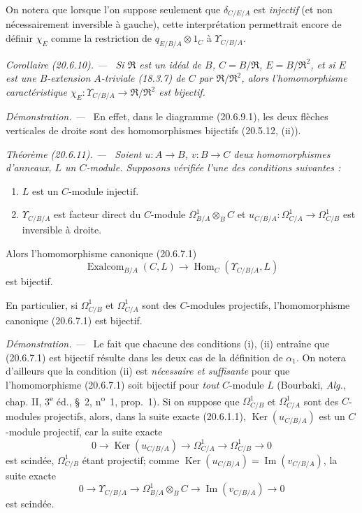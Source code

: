 \documentclass[10pt,oneside]{book}
\makeatletter
\newcommand{\setmanualcurrentlabel}[1]{\def\@currentlabel{#1}}
\newcommand{\oldpage}[2][]{%
  \setcounter{footnote}{0}%
  \marginpar{\scriptsize\textbf{#1}~|~#2}\ignorespaces}
\newenvironment{theorem}[1][]{%
  \setmanualcurrentlabel{#1}\par\medskip\noindent\itshape Théorème (#1). ---\ }{\par}
\newenvironment{corollary}[1][]{%
  \setmanualcurrentlabel{#1}\par\medskip\noindent\itshape Corollaire (#1). ---\ }{\par}
\newenvironment{proof}{%
  \par\medskip\noindent\textit{Démonstration. ---\ }}{\par}
\makeatother
\begin{document}
On notera que lorsque l'on suppose seulement que $\delta_{C/E/A}$ est
\emph{injectif} (et non nécessairement inversible à gauche), cette
interprétation permettrait encore de définir $\chi_E$ comme la
restriction de $q_{E/B/A}\otimes1_C$ à $\Upsilon_{C/B/A}$.

\begin{corollary}[20.6.10]
\label{0.20.6.10-fr}
Si $\mathfrak{R}$ est un idéal de $B$, $C=B/\mathfrak{R}$,
$E=B/\mathfrak{R}^2$, et si $E$ est une $B$-extension $A$-triviale
(18.3.7) de $C$ par $\mathfrak{R}/\mathfrak{R}^2$, alors
l'homomorphisme caractéristique
$\chi_E:\Upsilon_{C/B/A}\to\mathfrak{R}/\mathfrak{R}^2$ est bijectif.
\end{corollary}

\begin{proof}
\oldpage[0\textsubscript{IV-1}]{140}
En effet, dans le diagramme (20.6.9.1), les deux flèches verticales de
droite sont des homomorphismes bijectifs (20.5.12, (ii)).
\end{proof}

\begin{theorem}[20.6.11]
\label{0.20.6.11-fr}
Soient $u:A\to B$, $v:B\to C$ deux homomorphismes d'anneaux, $L$ un
$C$-module. Supposons vérifiée l'une des conditions suivantes :
\begin{enumerate}
  \item[\rm(i)] $L$ est un $C$-module injectif.
  \item[\rm(ii)] $\Upsilon_{C/B/A}$ est facteur direct du $C$-module
$\Omega^1_{B/A}\otimes_B C$ et
$u_{C/B/A}:\Omega^1_{C/A}\to\Omega^1_{C/B}$ est inversible à droite.
\end{enumerate}
Alors l'homomorphisme canonique (20.6.7.1)
\[
  \operatorname{Exalcom}_{B/A}(C,L)\longrightarrow
  \operatorname{Hom}_C(\Upsilon_{C/B/A},L)
\]
est bijectif.

En particulier, si $\Omega^1_{C/B}$ et $\Omega^1_{C/A}$ sont des
$C$-modules projectifs, l'homomorphisme canonique (20.6.7.1) est
bijectif.
\end{theorem}

\begin{proof}
Le fait que chacune des conditions (i), (ii) entraîne que (20.6.7.1) est
bijectif résulte dans les deux cas de la définition de $\alpha_1$. On
notera d'ailleurs que la condition (ii) est \emph{nécessaire et
suffisante} pour que l'homomorphisme (20.6.7.1) soit bijectif pour
\emph{tout} $C$-module $L$ (Bourbaki, \emph{Alg.}, chap. II,
3\textsuperscript{e} éd., \S~2, n\textsuperscript{o}~1, prop.~1). Si on
suppose que $\Omega^1_{C/B}$ et $\Omega^1_{C/A}$ sont des $C$-modules
projectifs, alors, dans la suite exacte (20.6.1.1),
$\operatorname{Ker}(u_{C/B/A})$ est un $C$-module projectif, car la suite exacte
\[
  0\longrightarrow\operatorname{Ker}(u_{C/B/A})\longrightarrow\Omega^1_{C/A}
  \longrightarrow\Omega^1_{C/B}\longrightarrow0
\]
est scindée, $\Omega^1_{C/B}$ étant projectif; comme
$\operatorname{Ker}(u_{C/B/A})=\operatorname{Im}(v_{C/B/A})$, la suite exacte
\[
  0\longrightarrow\Upsilon_{C/B/A}\longrightarrow
  \Omega^1_{B/A}\otimes_B C\longrightarrow
  \operatorname{Im}(v_{C/B/A})\longrightarrow0
\]
est scindée.
\end{proof}
\end{document}
